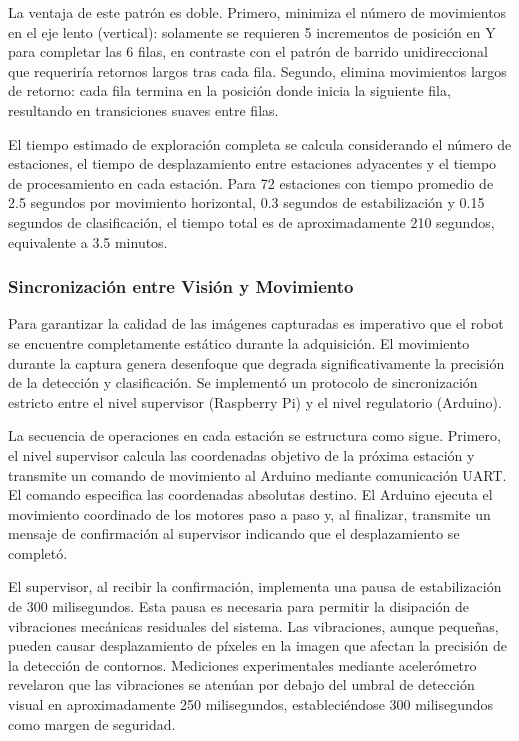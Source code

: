 La ventaja de este patrón es doble. Primero, minimiza el número de movimientos en el eje lento (vertical): solamente se requieren 5 incrementos de posición en Y para completar las 6 filas, en contraste con el patrón de barrido unidireccional que requeriría retornos largos tras cada fila. Segundo, elimina movimientos largos de retorno: cada fila termina en la posición donde inicia la siguiente fila, resultando en transiciones suaves entre filas.

El tiempo estimado de exploración completa se calcula considerando el número de estaciones, el tiempo de desplazamiento entre estaciones adyacentes y el tiempo de procesamiento en cada estación. Para 72 estaciones con tiempo promedio de 2.5 segundos por movimiento horizontal, 0.3 segundos de estabilización y 0.15 segundos de clasificación, el tiempo total es de aproximadamente 210 segundos, equivalente a 3.5 minutos.

\subsubsection{Sincronización entre Visión y Movimiento}

Para garantizar la calidad de las imágenes capturadas es imperativo que el robot se encuentre completamente estático durante la adquisición. El movimiento durante la captura genera desenfoque que degrada significativamente la precisión de la detección y clasificación. Se implementó un protocolo de sincronización estricto entre el nivel supervisor (Raspberry Pi) y el nivel regulatorio (Arduino).

La secuencia de operaciones en cada estación se estructura como sigue. Primero, el nivel supervisor calcula las coordenadas objetivo de la próxima estación y transmite un comando de movimiento al Arduino mediante comunicación UART. El comando especifica las coordenadas absolutas destino. El Arduino ejecuta el movimiento coordinado de los motores paso a paso y, al finalizar, transmite un mensaje de confirmación al supervisor indicando que el desplazamiento se completó.

El supervisor, al recibir la confirmación, implementa una pausa de estabilización de 300 milisegundos. Esta pausa es necesaria para permitir la disipación de vibraciones mecánicas residuales del sistema. Las vibraciones, aunque pequeñas, pueden causar desplazamiento de píxeles en la imagen que afectan la precisión de la detección de contornos. Mediciones experimentales mediante acelerómetro revelaron que las vibraciones se atenúan por debajo del umbral de detección visual en aproximadamente 250 milisegundos, estableciéndose 300 milisegundos como margen de seguridad.

